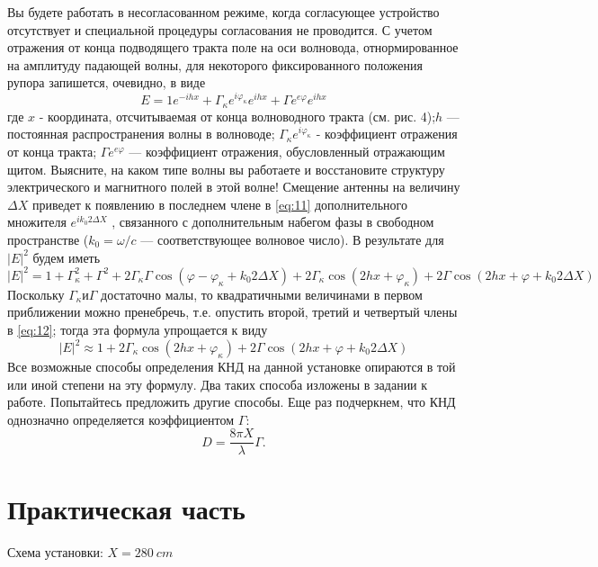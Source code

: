 Вы будете работать в несогласованном режиме, когда согласующее устройство отсутствует и специальной процедуры 
согласования не проводится. С учетом отражения от конца подводящего тракта поле на оси волновода, отнормированное на 
амплитуду падающей волны, для некоторого фиксированного положения рупора запишется, очевидно, в виде
\begin{equation}
    E = 1e^{-ihx}+\Gamma_\kappa e^{i\varphi_\kappa} e^{ihx}+ \Gamma e^{e\varphi} e^{ihx}
    \label{eq:11}
\end{equation}
где $x$ - координата, отсчитываемая от конца волноводного тракта (см. рис. 4);$h$ — постоянная распространения волны в 
волноводе; $\Gamma_\kappa e^{i\varphi_\kappa}$ - коэффициент отражения от конца тракта; $\Gamma e^{e\varphi}$ — коэффициент 
отражения, обусловленный отражающим щитом. Выясните, на каком типе волны вы работаете и восстановите структуру 
электрического и магнитного полей в этой волне! Смещение антенны на величину $\Delta X$ приведет к появлению в последнем члене 
в \ref{eq:11} дополнительного множителя $ e^{ i k_0 2\Delta X } $ , связанного с дополнительным набегом фазы в свободном пространстве
($k_0=\omega/c$ — соответствующее волновое число). В результате для $ |E|^2 $ будем иметь
\begin{equation}
    |E|^{2} =1+\Gamma_{\kappa}^{2}+\Gamma^{2}+2 \Gamma_{\kappa} \Gamma \cos {(\varphi-\varphi_{\kappa}+k_{0} 2 \Delta X)} + 2 \Gamma_{\kappa} \cos{(2 h x+\varphi_{\kappa})}+2 \Gamma \cos{(2 h x+\varphi+k_{0} 2 \Delta X)}
    \label{eq:12}
\end{equation}
Поскольку $ \Gamma_{\kappa} \text{и} \Gamma$ достаточно малы, то квадратичными величинами в первом приближении можно 
пренебречь, т.е. опустить второй, третий и четвертый члены в \ref{eq:12}; тогда эта формула упрощается к виду
\begin{equation}
    |E|^{2} \approx 1+2 \Gamma_{\kappa} \cos \left(2 h x+\varphi_{\kappa}\right)+2 \Gamma \cos \left(2 h x+\varphi+k_{0} 2 \Delta X\right)
    \label{eq:13}
\end{equation}
Все возможные способы определения КНД на данной установке опираются в той или иной степени на эту формулу. Два таких 
способа изложены в задании к работе. Попытайтесь предложить другие способы. Еще раз подчеркнем, что КНД однозначно 
определяется коэффициентом $\Gamma$:
\begin{equation}
    D = \frac{8 \pi X}{\lambda} \Gamma.
    \label{eq:14}
\end{equation}


\newpage
\section{Практическая часть}
Схема установки:
$X = 280~ cm$

